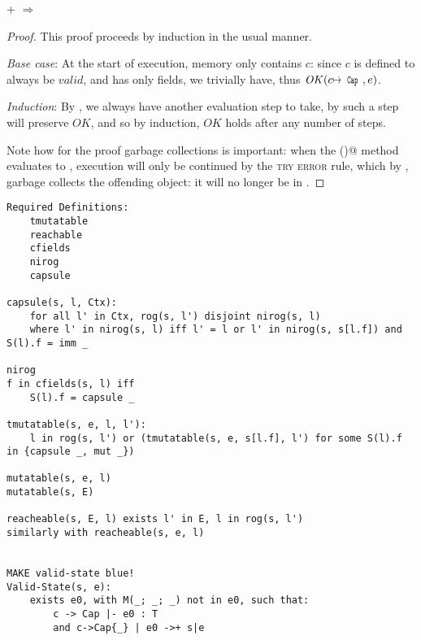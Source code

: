 \begin{theorem}\rm
	 +  $\Rightarrow$ 
\end{theorem}
\begin{proof}
This proof proceeds by induction in the usual manner.

\emph{Base case}: At the start of execution, memory only contains $c$: since $c$ is defined to always be $\mathit{valid}$, and has only \Q@mut@ fields, we trivially have, thus $\mathit{OK}(c\mapsto\Kw{Cap},e)$.

\emph{Induction}: By , we always have another evaluation step to take, by  such a step will preserve $\mathit{OK}$, and so by induction, $\mathit{OK}$ holds after any number of steps.

Note how for the proof garbage collections is important:
when the \Q@invariant()@ method evaluates to \Q@false@,
execution will only be continued by the \textsc{try error} rule, which by , garbage collects the offending object: it will no longer be in \s.

\end{proof}

\bigskip
\begin{verbatim}
Required Definitions:
	tmutatable
	reachable
	cfields
	nirog
	capsule
	
capsule(s, l, Ctx):
    for all l' in Ctx, rog(s, l') disjoint nirog(s, l)
    where l' in nirog(s, l) iff l' = l or l' in nirog(s, s[l.f]) and S(l).f = imm _

nirog
f in cfields(s, l) iff
    S(l).f = capsule _
	
tmutatable(s, e, l, l'):
    l in rog(s, l') or (tmutatable(s, e, s[l.f], l') for some S(l).f in {capsule _, mut _})

mutatable(s, e, l)
mutatable(s, E)

reacheable(s, E, l) exists l' in E, l in rog(s, l')
similarly with reacheable(s, e, l)
	
	
MAKE valid-state blue!
Valid-State(s, e):
    exists e0, with M(_; _; _) not in e0, such that:
        c -> Cap |- e0 : T
        and c->Cap{_} | e0 ->+ s|e
\end{verbatim}



